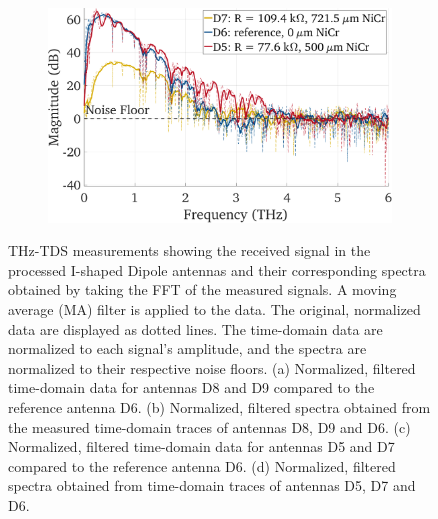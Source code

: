 \begin{figure}[!]
\begin{subfigure}[b]{0.49\textwidth}
        \caption{\centering}
        \label{comp_d6_d5_d7_time}
    \end{subfigure}
    \hfill
    \begin{subfigure}[b]{0.49\textwidth}
        \centering
        \includegraphics[height=0.6\textwidth]{figures/Results/mainTextComp/D6_D5_D7/D6_D5_D7_spectrum.pdf}
        \caption{\centering}
        \label{comp_d6_d5_d7_spec}
    \end{subfigure}
    \caption{THz-TDS measurements showing the received signal in the processed I-shaped Dipole antennas and their corresponding spectra obtained by taking the FFT of the measured signals. A moving average (MA) filter is applied to the data. The original, normalized data are displayed as dotted lines. The time-domain data are normalized to each signal’s amplitude, and the spectra are normalized to their respective noise floors. (a) Normalized, filtered time-domain data for antennas D8 and D9 compared to the reference antenna D6. (b) Normalized, filtered spectra obtained from the measured time-domain traces of antennas D8, D9 and D6. (c) Normalized, filtered time-domain data for antennas D5 and D7 compared to the reference antenna D6. (d) Normalized, filtered spectra obtained from time-domain traces of antennas D5, D7 and D6.}
    \label{comp_I_dipoles}
\end{figure}



